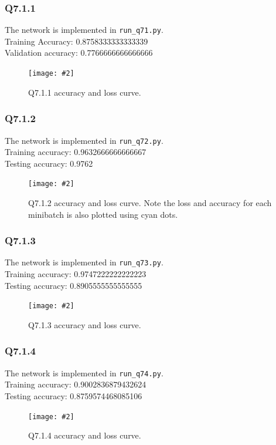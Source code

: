 \documentclass{article} %
\newcommand{\img}[3][0.3]{    
    \begin{figure}[H]
        \centering
        \texttt{[image: \#2]}
        \caption{#3}
    \end{figure}
}
\begin{document}
    \subsubsection*{Q7.1.1}
    The network is implemented in \verb|run_q71.py|.\\
    Training Accuracy:  0.8758333333333339\\
    Validation accuracy:  0.7766666666666666

    \img{7,1 loss acc graph.png}{Q7.1.1 accuracy and loss curve.}

    \subsubsection*{Q7.1.2}
    The network is implemented in \verb|run_q72.py|.\\
    Training accuracy: 0.9632666666666667\\
    Testing accuracy: 0.9762

    \img{7,2 loss acc graph final.png}{Q7.1.2 accuracy and loss curve. Note the loss and accuracy for each minibatch is also plotted using cyan dots.}

    \subsubsection*{Q7.1.3}
    The network is implemented in \verb|run_q73.py|.\\
    Training accuracy: 0.9747222222222223\\
    Testing accuracy: 0.8905555555555555

    \img{7,3 loss acc graph final.png}{Q7.1.3 accuracy and loss curve.}

    \subsubsection*{Q7.1.4}
    The network is implemented in \verb|run_q74.py|.\\
    Training accuracy: 0.9002836879432624\\
    Testing accuracy: 0.8759574468085106

    \img{7,4 loss acc graph final.png}{Q7.1.4 accuracy and loss curve.}
\end{document}
